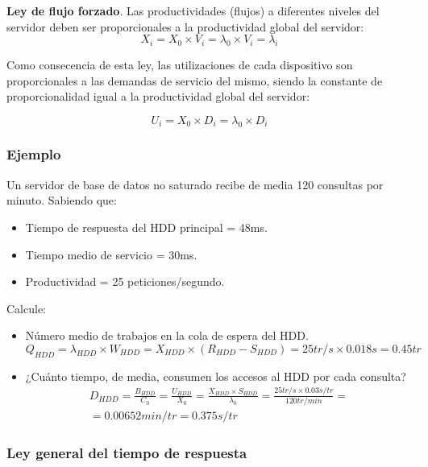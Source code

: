 \documentclass[12pt,spanish]{article}
\begin{document}
\textbf{Ley de flujo forzado}. Las productividades (flujos) a diferentes niveles del servidor deben ser proporcionales a la productividad global del servidor:
\begin{equation*}
	X_i = X_0 \times V_i = \lambda_0 \times V_i = \lambda_i
\end{equation*}

Como consecencia de esta ley, las utilizaciones de cada dispositivo son proporcionales a las demandas de servicio del mismo, siendo la constante de proporcionalidad igual a la productividad global del servidor:

\begin{equation*}
	U_i=X_0 \times D_i = \lambda_0 \times D_i
\end{equation*}


\subsubsection{Ejemplo}

Un servidor de base de datos no saturado recibe de media 120 consultas por minuto. Sabiendo que:
\begin{itemize}
	\item Tiempo de respuesta del HDD principal = 48ms.
	\item Tiempo medio de servicio = 30ms.
	\item Productividad = 25 peticiones/segundo.
\end{itemize}
Calcule:
\begin{itemize}
	\item Número medio de trabajos en la cola de espera del HDD.
	\begin{equation*}
		Q_{HDD}=\lambda_{HDD} \times W_{HDD} = X_{HDD} \times (R_{HDD} - S_{HDD}) = 25 tr/s \times 0.018 s = 0.45 tr
	\end{equation*}
	\item ¿Cuánto tiempo, de media, consumen los accesos al HDD por cada consulta?
	\begin{gather*}
		D_{HDD} = \frac{B_{HDD}}{C_0}=\frac{U_{HDD}}{X_0}=\frac{X_{HDD} \times S_{HDD}}{\lambda_0}=\frac{25 tr/s \times 0.03 s/tr}{120 tr/min}=\\=0.00652 min/tr = 0.375 s/tr
	\end{gather*}

\end{itemize}

\subsubsection{Ley general del tiempo de respuesta}
\end{document}
